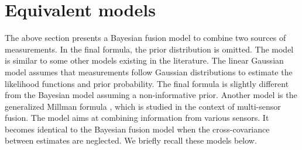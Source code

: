 \section{Equivalent models}
The above section presents a Bayesian fusion model to combine two sources of measurements. In the final formula, the prior distribution is omitted. The model is similar to some other models existing in the literature. The linear Gaussian model assumes that measurements follow Gaussian distributions to estimate the likelihood functions and prior probability. The final formula is slightly different from the Bayesian model assuming a non-informative prior. Another model is the generalized Millman formula \citep{shin2006generalized}, which is studied in the context of multi-sensor fusion. The model aims at combining information from various sensors. It becomes identical to the Bayesian fusion model when the cross-covariance between estimates are neglected. We briefly recall these models below.

